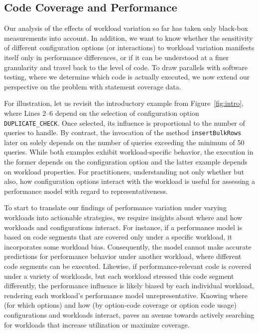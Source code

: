 \subsection{Code Coverage and Performance}\label{sec:rq3}
{\color{red!50!black}
Our analysis of the effects of workload variation so far has taken only black-box measurements into account. In addition, we want to know whether the sensitivity of different configuration options (or interactions) to workload variation manifests itself only in performance differences, or if it can be understood at a finer granularity and travel back to the level of code. To draw parallels with software testing, where we determine which code is actually executed, we now extend our perspective on the problem with statement coverage data. 


For illustration, let us revisit the introductory example from Figure~\ref{fig:intro}, where \colorbox{duplicatecheck}{Lines 2--6} depend on the selection of configuration option \texttt{DUPLICATE\_CHECK}. Once selected, its influence is proportional to the number of queries to handle. By contrast, the invocation of the method \texttt{insertBulkRows} later on solely depends on the number of queries exceeding the minimum of 50 queries. While both examples exhibit workload-specific behavior, the execution in the former depends on the configuration option and the latter example depends on workload properties. 
For practitioners, understanding not only whether but also, how configuration options interact with the workload is useful for assessing a performance model with regard to representativeness. 

To start to translate our findings of performance variation under varying workloads into actionable strategies, we require insights about where and how workloads and configurations interact. For instance, if a performance model is based on code segments that are covered only under a specific workload, it incorporates some workload bias. Consequently, the model cannot make accurate predictions for performance behavior under another workload, where different code segments can be executed. Likewise, if performance-relevant code is covered under a variety of workloads, but each workload stressed this code segment differently, the performance influence is likely biased by each individual workload, rendering each workload's performance model unrepresentative. Knowing where (for which options) and how (by option-code coverage or option code usage) configurations and workloads interact, paves an avenue towards actively searching for workloads that increase utilization or maximize coverage.

}

